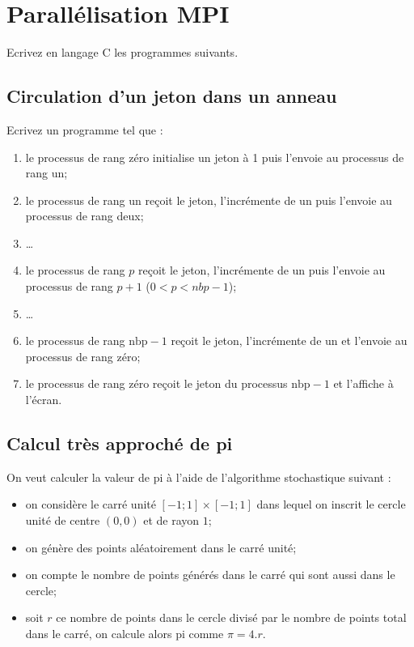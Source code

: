 \documentclass[11pt,a4paper]{article}
\begin{document}
\section{Parallélisation MPI}

Ecrivez en langage C les programmes suivants.

\subsection{Circulation d'un jeton dans un anneau}

Ecrivez un programme tel que :
\begin{enumerate}
	\item le processus de rang zéro initialise un jeton à 1 puis l'envoie au processus de rang un;
	\item le processus de rang un reçoit le jeton, l'incrémente de un puis l'envoie au processus de rang deux;
	\item \ldots
	\item le processus de rang $p$ reçoit le jeton, l'incrémente de un puis l'envoie au processus de rang $p+1$ ($0<p<nbp-1$);
	\item \ldots
	\item le processus de rang $\mbox{nbp}-1$ reçoit le jeton, l'incrémente de un et l'envoie au processus de rang zéro;
	\item le processus de rang zéro reçoit le jeton du processus $\mbox{nbp}-1$ et l'affiche à l'écran.
\end{enumerate}

\subsection{Calcul tr\`es approch\'e de pi}

On veut calculer la valeur de pi à l'aide de l'algorithme stochastique suivant :
\begin{itemize}
\item on considère le carré unité
$\left[-1;1\right]\times \left[-1;1\right]$ dans lequel on inscrit le cercle unité de centre $(0,0)$ et de rayon $1$;
\item on génère des points aléatoirement dans le carré unité;
\item on compte le nombre de points générés dans le carré qui sont aussi dans le cercle;
\item soit $r$ ce nombre de points dans le cercle divisé par le nombre de points
  total dans le carré, on calcule alors pi comme $\pi = 4.r$.
\end{itemize}
\end{document}
